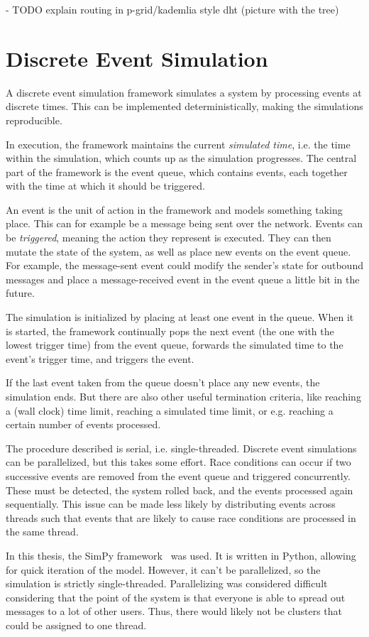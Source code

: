 - TODO explain routing in p-grid/kademlia style dht (picture with the tree)

\section{Discrete Event Simulation}
A discrete event simulation framework simulates a system by processing events at
discrete times. This can be implemented deterministically, making the
simulations reproducible.

In execution, the framework maintains the current
\emph{simulated time}, i.e. the time within the simulation, which counts up as
the simulation progresses. The central part of the framework is the event queue,
which contains events, each together with the time at which it should be
triggered.

An event is the unit of action in the framework and models something taking
place. This can for example be a message being sent over the network. Events can
be \emph{triggered}, meaning the action they represent is executed. They can
then mutate the state of the system, as well as place new events on the event
queue. For example, the message-sent event could modify the sender's state for
outbound messages and place a message-received event in the event queue a little
bit in the future.

The simulation is initialized by placing at least one event in the queue. When
it is started, the framework continually pops the next event (the one with the
lowest trigger time) from the event queue, forwards the simulated time to the
event's trigger time, and triggers the event.

If the last event taken from the queue doesn't place any new events, the
simulation ends. But there are also other useful termination criteria, like
reaching a (wall clock) time limit, reaching a simulated time limit, or e.g.
reaching a certain number of events processed.

The procedure described is serial, i.e. single-threaded. Discrete event
simulations can be parallelized, but this takes some effort. Race conditions can
occur if two successive events are removed from the event queue and triggered
concurrently. These must be detected, the system rolled back, and the events
processed again sequentially. This issue can be made less likely by distributing
events across threads such that events that are likely to cause race conditions
are processed in the same thread.

In this thesis, the SimPy framework~\cite{simpy} was used. It is written in
Python, allowing for quick iteration of the model. However, it can't be
parallelized, so the simulation is strictly single-threaded. Parallelizing was
considered difficult considering that the point of the system is that everyone
is able to spread out messages to a lot of other users. Thus, there would likely
not be clusters that could be assigned to one thread.

